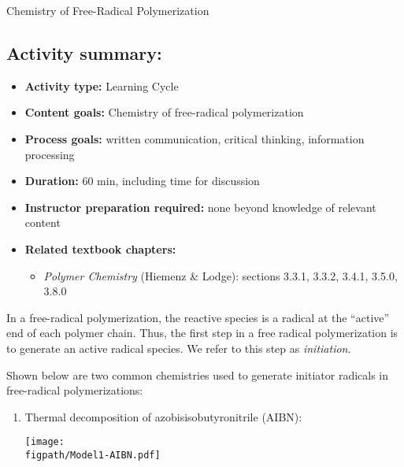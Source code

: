 \begin{activity}{Chemistry of Free-Radical Polymerization}
\begin{instructornotes}
	\subsection*{Activity summary:}
	\begin{itemize}
		\item \textbf{Activity type:} Learning Cycle
		\item \textbf{Content goals:} Chemistry of free-radical polymerization
		\item \textbf{Process goals:} %
			written communication, critical thinking, information processing
		\item \textbf{Duration:} 60 min, including time for discussion
		\item \textbf{Instructor preparation required:} none beyond knowledge of relevant content
		\item \textbf{Related textbook chapters:}
			\begin{itemize}
				\item \emph{Polymer Chemistry} (Hiemenz \& Lodge): sections 3.3.1, 3.3.2, 3.4.1, 3.5.0, 3.8.0
			\end{itemize}
	\end{itemize}
	
\end{instructornotes}


\begin{model}[Initiation]
	\label{\labelbase:mdl:FRPinitchem}

	In a free-radical polymerization, the reactive species is a radical at the ``active'' end of each polymer chain.  Thus, the first step in a free radical polymerization is to generate an active radical species.  We refer to this step as \emph{initiation}.
	
	Shown below are two common chemistries used to generate initiator radicals in free-radical polymerizations:
	
	\begin{enumerate}
		\item Thermal decomposition of azobisisobutyronitrile (AIBN):
	
			\centerline{\texttt{[image: \\figpath/Model1-AIBN.pdf]}}
			

\end{enumerate}
\end{model}
\end{activity}
